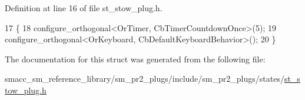 Definition at line 16 of file st\+\_\+stow\+\_\+plug.\+h.


\begin{DoxyCode}
17     \{
18         configure\_orthogonal<OrTimer,  CbTimerCountdownOnce>(5);    
19         configure\_orthogonal<OrKeyboard, CbDefaultKeyboardBehavior>();
20     \}
\end{DoxyCode}


The documentation for this struct was generated from the following file\+:\begin{DoxyCompactItemize}
\item 
smacc\+\_\+sm\+\_\+reference\+\_\+library/sm\+\_\+pr2\+\_\+plugs/include/sm\+\_\+pr2\+\_\+plugs/states/\hyperlink{st__stow__plug_8h}{st\+\_\+stow\+\_\+plug.\+h}\end{DoxyCompactItemize}
